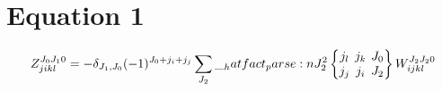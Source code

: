 \documentclass{scrartcl}
\newcommand{\sixj}[6]{\begingroup\setlength{\arraycolsep}{0.2em}\begin{Bmatrix} #1 & #2 & #3 \\ #4 & #5 & #6 \end{Bmatrix}\endgroup}
\begin{document}
\section{Equation 1}
\begin{dmath*}
Z_{j i k l}^{{J}_{0} {J}_{1} 0} = -\delta_{{J}_{1},{J}_{0}} \* (-1)^{{J}_{0}+{j}_{i}+{j}_{j}} \* \sum_{{J}_{2}} \* \hatfact{{J}_{2}^{2}} \* \sixj{{j}_{l}}{{j}_{k}}{{J}_{0}}{{j}_{j}}{{j}_{i}}{{J}_{2}} \* W_{i j k l}^{{J}_{2} {J}_{2} 0}
\end{dmath*}
\end{document}
